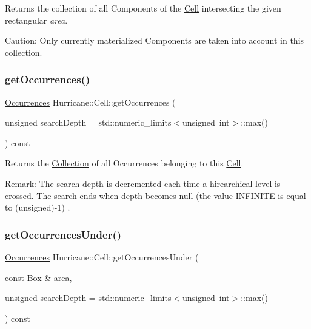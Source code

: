 Returns the collection of all Components of the \mbox{\hyperlink{classHurricane_1_1Cell}{Cell}} intersecting the given rectangular {\itshape area}.

\begin{DoxyParagraph}{Caution\+: Only currently materialized Components are taken into account}
in this collection. 
\end{DoxyParagraph}
\mbox{\label{classHurricane_1_1Cell_ab5bbab0a59106855d61deb94805e6115}} 
\subsubsection{\texorpdfstring{get\+Occurrences()}{getOccurrences()}}
{\footnotesize\ttfamily \mbox{\hyperlink{namespaceHurricane_a1912927c128eee859af62dbe4cbe0a6b}{Occurrences}} Hurricane\+::\+Cell\+::get\+Occurrences (\begin{DoxyParamCaption}\item[{unsigned}]{search\+Depth = {\ttfamily std\+:\+:numeric\+\_\+limits$<$unsigned~int$>$\+:\+:max()} }\end{DoxyParamCaption}) const}

Returns the \mbox{\hyperlink{classHurricane_1_1Collection}{Collection}} of all Occurrences belonging to this \mbox{\hyperlink{classHurricane_1_1Cell}{Cell}}.

\begin{DoxyParagraph}{Remark\+: The search depth is decremented each time a hirearchical}
level is crossed. The search ends when depth becomes null (the value {\ttfamily I\+N\+F\+I\+N\+I\+TE} is equal to {\ttfamily }(unsigned)-\/1) . 
\end{DoxyParagraph}
\mbox{\label{classHurricane_1_1Cell_a7fb09c8e350923c47ce4c4407bdb00ce}} 
\subsubsection{\texorpdfstring{get\+Occurrences\+Under()}{getOccurrencesUnder()}}
{\footnotesize\ttfamily \mbox{\hyperlink{namespaceHurricane_a1912927c128eee859af62dbe4cbe0a6b}{Occurrences}} Hurricane\+::\+Cell\+::get\+Occurrences\+Under (\begin{DoxyParamCaption}\item[{const \mbox{\hyperlink{classHurricane_1_1Box}{Box}} \&}]{area,  }\item[{unsigned}]{search\+Depth = {\ttfamily std\+:\+:numeric\+\_\+limits$<$unsigned~int$>$\+:\+:max()} }\end{DoxyParamCaption}) const}

